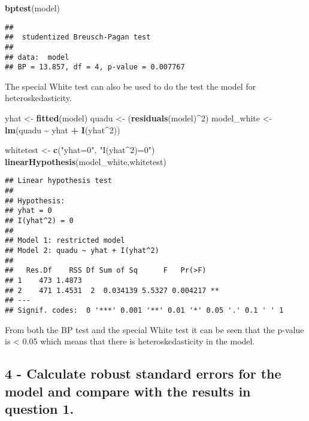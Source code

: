 \documentclass[
]{article}
\newenvironment{Shaded}{\begin{snugshade}}{\end{snugshade}}
\newcommand{\DecValTok}[1]{\textcolor[rgb]{0.00,0.00,0.81}{#1}}
\newcommand{\FunctionTok}[1]{\textcolor[rgb]{0.13,0.29,0.53}{\textbf{#1}}}
\newcommand{\NormalTok}[1]{#1}
\newcommand{\OtherTok}[1]{\textcolor[rgb]{0.56,0.35,0.01}{#1}}
\newcommand{\SpecialCharTok}[1]{\textcolor[rgb]{0.81,0.36,0.00}{\textbf{#1}}}
\newcommand{\StringTok}[1]{\textcolor[rgb]{0.31,0.60,0.02}{#1}}
\begin{document}
\begin{Shaded}
\begin{Highlighting}[]
\FunctionTok{bptest}\NormalTok{(model)}
\end{Highlighting}
\end{Shaded}

\begin{verbatim}
## 
##  studentized Breusch-Pagan test
## 
## data:  model
## BP = 13.857, df = 4, p-value = 0.007767
\end{verbatim}

The special White test can also be used to do the test the model for
heteroskedasticity.

\begin{Shaded}
\begin{Highlighting}[]
\NormalTok{yhat }\OtherTok{\textless{}{-}} \FunctionTok{fitted}\NormalTok{(model)}
\NormalTok{quadu }\OtherTok{\textless{}{-}}\NormalTok{ (}\FunctionTok{residuals}\NormalTok{(model)}\SpecialCharTok{\^{}}\DecValTok{2}\NormalTok{)}
\NormalTok{model\_white }\OtherTok{\textless{}{-}} \FunctionTok{lm}\NormalTok{(quadu }\SpecialCharTok{\textasciitilde{}}\NormalTok{ yhat }\SpecialCharTok{+} \FunctionTok{I}\NormalTok{(yhat}\SpecialCharTok{\^{}}\DecValTok{2}\NormalTok{))}

\NormalTok{whitetest }\OtherTok{\textless{}{-}} \FunctionTok{c}\NormalTok{(}\StringTok{"yhat=0"}\NormalTok{, }\StringTok{"I(yhat\^{}2)=0"}\NormalTok{)}
\FunctionTok{linearHypothesis}\NormalTok{(model\_white,whitetest)}
\end{Highlighting}
\end{Shaded}

\begin{verbatim}
## Linear hypothesis test
## 
## Hypothesis:
## yhat = 0
## I(yhat^2) = 0
## 
## Model 1: restricted model
## Model 2: quadu ~ yhat + I(yhat^2)
## 
##   Res.Df    RSS Df Sum of Sq      F   Pr(>F)   
## 1    473 1.4873                                
## 2    471 1.4531  2  0.034139 5.5327 0.004217 **
## ---
## Signif. codes:  0 '***' 0.001 '**' 0.01 '*' 0.05 '.' 0.1 ' ' 1
\end{verbatim}

From both the BP test and the special White test it can be seen that the
p-value is \textless{} 0.05 which means that there is heteroskedasticity
in the model.

\subsection{4 - Calculate robust standard errors for the model and
compare with the results in question
1.}\label{calculate-robust-standard-errors-for-the-model-and-compare-with-the-results-in-question-1.}
\end{document}
